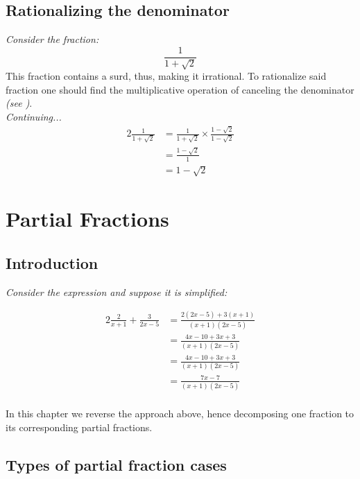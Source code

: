 \documentclass[12pt, a4paper]{report}
\theoremstyle{definition}
\begin{document}
	\section{Rationalizing the denominator}
	\quad \emph{Consider the fraction:} 
	$$\frac{1}{1+\sqrt{2}}$$
	This fraction contains a surd, thus, making it irrational. To rationalize said fraction one should find the multiplicative operation of canceling the denominator \textit{(see \footnotemark[1])}.\\
	
	
	\emph{Continuing...}
	\begin{alignat*}{2}
		\frac{1}{1+\sqrt{2}} & = \frac{1}{1+\sqrt{2}} \times \frac{1-\sqrt{2}}{1-\sqrt{2}} \\
		& =\frac{1-\sqrt{2}}{1}                                       \\
		& =1-\sqrt{2}                                                 
	\end{alignat*} 
	
	
	\chapter{Partial Fractions}
	\section{Introduction}
	\emph{Consider the expression and suppose it is simplified:}
	
	
	\begin{alignat*}{2}
		\frac{2}{x+1}+\frac{3}{2x-5} & = \frac{2(2x-5)+3(x+1)}{(x+1)(2x-5)} \\
		& =\frac{4x-10+3x+3}{(x+1)(2x-5)}      \\
		& =\frac{4x-10+3x+3}{(x+1)(2x-5)}      \\
		& =\frac{7x-7}{(x+1)(2x-5)}            \\
	\end{alignat*}
	
	In this chapter we reverse the approach above, hence decomposing one fraction to its corresponding partial fractions.
	\newpage
	\section{Types of partial fraction cases}
\end{document}
